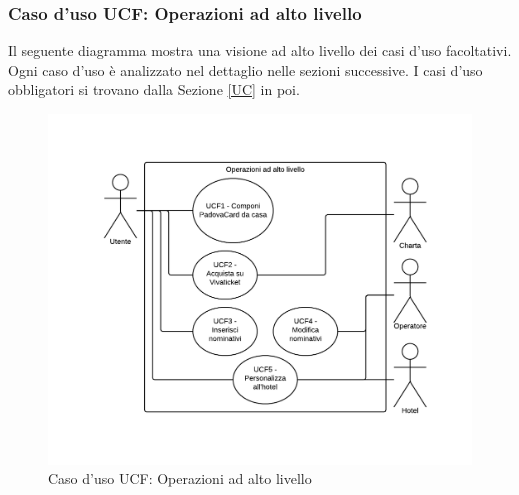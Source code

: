 \subsubsection{Caso d'uso UCF: Operazioni ad alto livello}\label{UCF}
Il seguente diagramma mostra una visione ad alto livello dei casi d'uso facoltativi. Ogni caso d'uso è analizzato nel dettaglio nelle sezioni successive. I casi d'uso obbligatori si trovano dalla Sezione \ref{UC} in poi.
\begin{figure}[H]
\centering
\includegraphics[width=1\textwidth]{images/UCF.png}
\caption{Caso d'uso UCF: Operazioni ad alto livello}
\end{figure}

